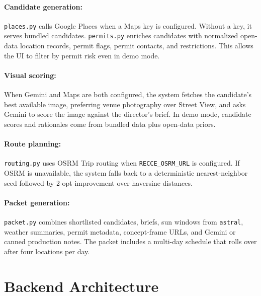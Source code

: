 \documentclass[11pt]{article}
\begin{document}
\paragraph{Candidate generation:}
\texttt{places.py} calls Google Places when a Maps key is configured. Without a
key, it serves bundled candidates. \texttt{permits.py} enriches candidates with
normalized open-data location records, permit flags, permit contacts, and
restrictions. This allows the UI to filter by permit risk even in demo mode.

\paragraph{Visual scoring:}
When Gemini and Maps are both configured, the system fetches the candidate's
best available image, preferring venue photography over Street View, and asks
Gemini to score the image against the director's brief. In demo mode, candidate
scores and rationales come from bundled data plus open-data priors.

\paragraph{Route planning:}
\texttt{routing.py} uses OSRM Trip routing when \texttt{RECCE\_OSRM\_URL} is
configured. If OSRM is unavailable, the system falls back to a deterministic
nearest-neighbor seed followed by 2-opt improvement over haversine distances.

\paragraph{Packet generation:}
\texttt{packet.py} combines shortlisted candidates, briefs, sun windows from
\texttt{astral}, weather summaries, permit metadata, concept-frame URLs, and
Gemini or canned production notes. The packet includes a multi-day schedule
that rolls over after four locations per day.

\section{Backend Architecture}
\end{document}
